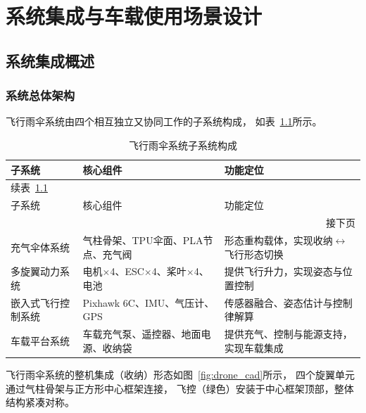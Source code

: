 
\chapter{系统集成与车载使用场景设计}

\section{系统集成概述}

\subsection{系统总体架构}

飞行雨伞系统由四个相互独立又协同工作的子系统构成，
如表~\ref{tab:subsystem_overview}所示。

\begin{longtable}{p{3.2cm} p{5.0cm} p{5.5cm}}
    \caption{飞行雨伞系统子系统构成}
    \label{tab:subsystem_overview} \\

    \toprule
    子系统 & 核心组件 & 功能定位 \\
    \midrule
    \endfirsthead

    \multicolumn{3}{l}{\small 续表~\ref*{tab:subsystem_overview}} \\[2pt]
    \toprule
    子系统 & 核心组件 & 功能定位 \\
    \midrule
    \endhead

    \midrule
    \multicolumn{3}{r}{\small 接下页} \\
    \endfoot

    \bottomrule
    \endlastfoot

    充气伞体系统
        & 气柱骨架、TPU伞面、PLA节点、充气阀
        & 形态重构载体，实现收纳$\leftrightarrow$飞行形态切换 \\[6pt]
    多旋翼动力系统
        & 电机$\times$4、ESC$\times$4、桨叶$\times$4、电池
        & 提供飞行升力，实现姿态与位置控制 \\[6pt]
    嵌入式飞行控制系统
        & Pixhawk 6C、IMU、气压计、GPS
        & 传感器融合、姿态估计与控制律解算 \\[6pt]
    车载平台系统
        & 车载充气泵、遥控器、地面电源、收纳袋
        & 提供充气、控制与能源支持，实现车载集成 \\


\end{longtable}
\FloatBarrier 
飞行雨伞系统的整机集成（收纳）形态如图~\ref{fig:drone_cad}所示，
四个旋翼单元通过气柱骨架与正方形中心框架连接，
飞控（绿色）安装于中心框架顶部，整体结构紧凑对称。

